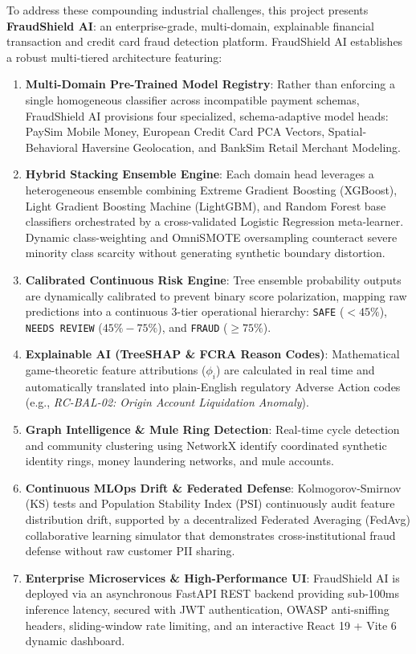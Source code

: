 \documentclass[12pt,a4paper,oneside]{report}
\begin{document}
To address these compounding industrial challenges, this project presents \textbf{FraudShield AI}: an enterprise-grade, multi-domain, explainable financial transaction and credit card fraud detection platform. FraudShield AI establishes a robust multi-tiered architecture featuring:
\begin{enumerate}[leftmargin=0.5in]
    \item \textbf{Multi-Domain Pre-Trained Model Registry}: Rather than enforcing a single homogeneous classifier across incompatible payment schemas, FraudShield AI provisions four specialized, schema-adaptive model heads: PaySim Mobile Money, European Credit Card PCA Vectors, Spatial-Behavioral Haversine Geolocation, and BankSim Retail Merchant Modeling.
    \item \textbf{Hybrid Stacking Ensemble Engine}: Each domain head leverages a heterogeneous ensemble combining Extreme Gradient Boosting (XGBoost), Light Gradient Boosting Machine (LightGBM), and Random Forest base classifiers orchestrated by a cross-validated Logistic Regression meta-learner. Dynamic class-weighting and OmniSMOTE oversampling counteract severe minority class scarcity without generating synthetic boundary distortion.
    \item \textbf{Calibrated Continuous Risk Engine}: Tree ensemble probability outputs are dynamically calibrated to prevent binary score polarization, mapping raw predictions into a continuous 3-tier operational hierarchy: \texttt{SAFE} ($< 45\%$), \texttt{NEEDS REVIEW} ($45\%-75\%$), and \texttt{FRAUD} ($\ge 75\%$).
    \item \textbf{Explainable AI (TreeSHAP \& FCRA Reason Codes)}: Mathematical game-theoretic feature attributions ($\phi_i$) are calculated in real time and automatically translated into plain-English regulatory Adverse Action codes (e.g., \textit{RC-BAL-02: Origin Account Liquidation Anomaly}).
    \item \textbf{Graph Intelligence \& Mule Ring Detection}: Real-time cycle detection and community clustering using NetworkX identify coordinated synthetic identity rings, money laundering networks, and mule accounts.
    \item \textbf{Continuous MLOps Drift \& Federated Defense}: Kolmogorov-Smirnov (KS) tests and Population Stability Index (PSI) continuously audit feature distribution drift, supported by a decentralized Federated Averaging (FedAvg) collaborative learning simulator that demonstrates cross-institutional fraud defense without raw customer PII sharing.
    \item \textbf{Enterprise Microservices \& High-Performance UI}: FraudShield AI is deployed via an asynchronous FastAPI REST backend providing sub-100ms inference latency, secured with JWT authentication, OWASP anti-sniffing headers, sliding-window rate limiting, and an interactive React 19 + Vite 6 dynamic dashboard.
\end{enumerate}
\end{document}
